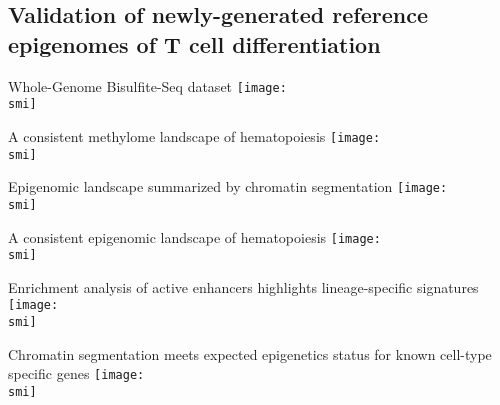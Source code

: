 \documentclass[10pt]{beamer}
\def\smi{out/ln/updir/mw-gcthesis-oral/library.bib}
\begin{document}
  \subsection{Validation of newly-generated reference epigenomes of T cell differentiation}
\begin{frame}{Whole-Genome Bisulfite-Seq dataset}
  \def\smi{out/ln/updir/mw-gcthesis-oral/ink/wgbs/matrix.pdf}
  \texttt{[image: \\smi]}%
\end{frame}
\begin{frame}{A consistent methylome landscape of hematopoiesis}
  \def\smi{out/ln/updir/mw-gcthesis-oral/ink/wgbs/matrix-tsne.pdf}
  \texttt{[image: \\smi]}%
\end{frame}
\begin{frame}{Epigenomic landscape summarized by chromatin segmentation}
  \def\smi{out/ln/updir/mw-gcthesis-oral/ink/chromatin-states/matrix-model.pdf}
  \texttt{[image: \\smi]}%
\end{frame}
\begin{frame}{A consistent epigenomic landscape of hematopoiesis}
  \def\smi{out/ln/updir/mw-gcthesis-oral/ink/chromatin-states/matrix-mca.pdf}
  \texttt{[image: \\smi]}
\end{frame}
  \begin{frame}{Enrichment analysis of active enhancers highlights lineage-specific signatures}
  \def\smi{out/ln/updir/mw-gcthesis-oral/ink/chromatin-states/msigdb-model.pdf}
  \texttt{[image: \\smi]}
\end{frame}
\begin{frame}{Chromatin segmentation meets expected epigenetics status for known cell-type specific genes} 
  \def\smi{out/ln/updir/mw-gcthesis-oral/ink/chromatin-states/genome-view/hematopoiesis/hsc-marker.pdf}
  \texttt{[image: \\smi]}
\end{frame}
\end{document}
